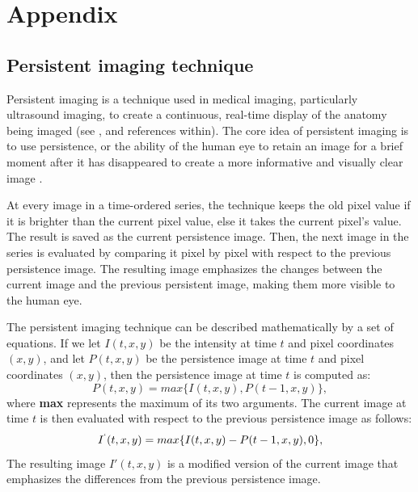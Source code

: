 \chapter{Appendix}
\label{appendix}

\section{Persistent imaging technique}
\label{ch3_append_a}
Persistent imaging is a technique used in medical imaging, particularly ultrasound imaging, to create a continuous, real-time display of the anatomy being imaged (see \citeauthor{pysz_2011} \citeyear{pysz_2011}, and references within). The core idea of persistent imaging is to use persistence, or the ability of the human eye to retain an image for a brief moment after it has disappeared to create a more informative and visually clear image \citep{fredkin_1995, thompson_2016}.

At every image in a time-ordered series, the technique keeps the old pixel value if it is brighter than the current pixel value, else it takes the current pixel's value. The result is saved as the current persistence image. Then, the next image in the series is evaluated by comparing it pixel by pixel with respect to the previous persistence image. The resulting image emphasizes the changes between the current image and the previous persistent image, making them more visible to the human eye.

The persistent imaging technique can be described mathematically by a set of equations. If we let $I(t,x,y)$ be the intensity at time $t$ and pixel coordinates $(x,y)$, and let $P(t,x,y)$ be the persistence image at time $t$ and pixel coordinates $(x,y)$, then the persistence image at time $t$ is computed as:
\begin{equation}
	P(t,x,y) = max\{I(t,x,y), P(t-1,x,y)\}
	,\end{equation}
where \textbf{max} represents the maximum of its two arguments. The current image at time $t$ is then evaluated with respect to the previous persistence image as follows:
\begin{equation}
	I^`(t,x,y) = max\{I(t,x,y) - P(t-1,x,y), 0\}
	,\end{equation}
The resulting image $I'(t,x,y)$ is a modified version of the current image that emphasizes the differences from the previous persistence image.

